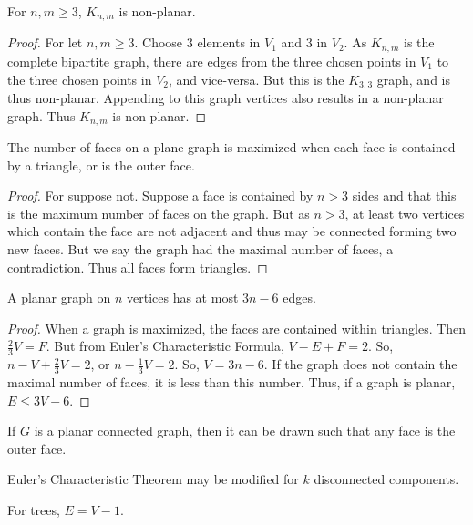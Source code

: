         \begin{theorem}
        For $n,m\geq 3$, $K_{n,m}$ is non-planar.
        \end{theorem}
        \begin{proof}
        For let $n,m\geq 3$. Choose $3$ elements in $V_1$ and $3$ in $V_2$. As $K_{n,m}$ is the complete bipartite graph, there are edges from the three chosen points in $V_1$ to the three chosen points in $V_2$, and vice-versa. But this is the $K_{3,3}$ graph, and is thus non-planar. Appending to this graph vertices also results in a non-planar graph. Thus $K_{n,m}$ is non-planar.
        \end{proof}
        \begin{lemma}
        The number of faces on a plane graph is maximized when each face is contained by a triangle, or is the outer face.
        \end{lemma}
        \begin{proof}
        For suppose not. Suppose a face is contained by $n>3$ sides and that this is the maximum number of faces on the graph. But as $n>3$, at least two vertices which contain the face are not adjacent and thus may be connected forming two new faces. But we say the graph had the maximal number of faces, a contradiction. Thus all faces form triangles.
        \end{proof}
        \begin{theorem}
        A planar graph on $n$ vertices has at most $3n-6$ edges.
        \end{theorem}
        \begin{proof}
        When a graph is maximized, the faces are contained within triangles. Then $\frac{2}{3}V= F$. But from Euler's Characteristic Formula, $V-E+F=2$. So, $n-V+\frac{2}{3}V = 2$, or $n-\frac{1}{3}V = 2$. So, $V=3n-6$. If the graph does not contain the maximal number of faces, it is less than this number. Thus, if a graph is planar, $E\leq 3V-6$.
        \end{proof}
        \begin{theorem}
        If $G$ is a planar connected graph, then it can be drawn such that any face is the outer face.
        \end{theorem}
        \begin{theorem}
        Euler's Characteristic Theorem may be modified for $k$ disconnected components.
        \end{theorem}
        \begin{corollary}
        For trees, $E=V-1$.
        \end{corollary}
